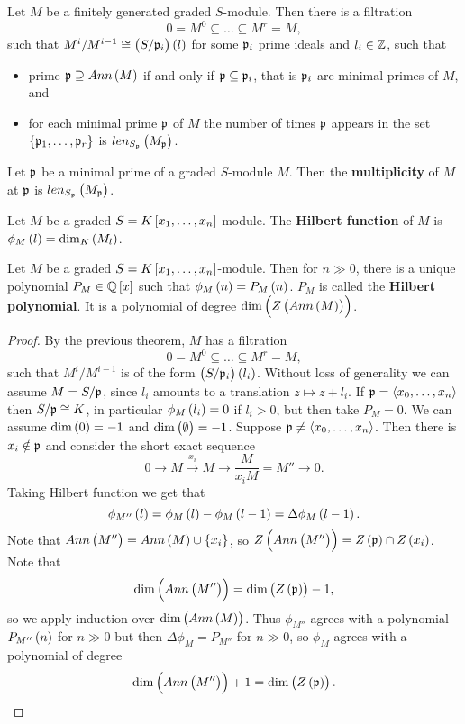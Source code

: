 \begin{theorem}
Let $ M $ be a finitely generated graded $ S $-module. Then there is a filtration
$$ 0 = M^0 \subseteq \dots \subseteq M^r = M, $$
such that $ M^i / M^{i - 1} \cong \br{S / \pp_i}\br{l} $ for some $ \mathfrak{p}_i $ prime ideals and $ l_i \in \mathbb{Z} $, such that
\begin{itemize}
\item prime $ \pp \supseteq Ann\br{M} $ if and only if $ \mathfrak{p} \subseteq \mathfrak{p}_i $, that is $ \mathfrak{p}_i $ are minimal primes of $ M $, and
\item for each minimal prime $ \mathfrak{p} $ of $ M $ the number of times $ \mathfrak{p} $ appears in the set $ \cbr{\pp_1, \dots, \pp_r} $ is $ len_{S_\pp}\br{M_\pp} $.
\end{itemize}
\end{theorem}


\begin{definition}
Let $ \mathfrak{p} $ be a minimal prime of a graded $ S $-module $ M $. Then the \textbf{multiplicity} of $ M $ at $ \mathfrak{p} $ is $ len_{S_\pp}\br{M_\pp} $.
\end{definition}

\begin{definition}
Let $ M $ be a graded $ S = K\sbr{x_1, \dots, x_n} $-module. The \textbf{Hilbert function} of $ M $ is $ \phi_M\br{l} = \dim_K\br{M_l} $.
\end{definition}

\begin{theorem}
Let $ M $ be a graded $ S = K\sbr{x_1, \dots, x_n} $-module. Then for $ n \gg 0 $, there is a unique polynomial $ P_M \in \Q\sbr{x} $ such that $ \phi_M\br{n} = P_M\br{n} $. $ P_M $ is called the \textbf{Hilbert polynomial}. It is a polynomial of degree $ \dim\br{Z\br{Ann\br{M}}} $.
\end{theorem}

\begin{proof}
By the previous theorem, $ M $ has a filtration
$$ 0 = M^0 \subseteq \dots \subseteq M^r = M, $$
such that $ M^i / M^{i - 1} $ is of the form $ \br{S / \pp_i}\br{l_i} $. Without loss of generality we can assume $ M = S / \mathfrak{p} $, since $ l_i $ amounts to a translation $ z \mapsto z + l_i $. If $ \mathfrak{p} = \left\langle x_0, \dots, x_n \right\rangle $ then $ S / \mathfrak{p} \cong K $, in particular $ \phi_M\br{l_i} = 0 $ if $ l_i > 0 $, but then take $ P_M = 0 $. We can assume $ \dim\br{0} = -1 $ and $ \dim\br{\emptyset} = -1 $. Suppose $ \mathfrak{p} \ne \left\langle x_0, \dots, x_n \right\rangle $. Then there is $ x_i \notin \mathfrak{p} $ and consider the short exact sequence
$$ 0 \to M \xrightarrow{x_i} M \to \dfrac{M}{x_iM} = M'' \to 0. $$
Taking Hilbert function we get that
$$ \phi_{M''}\br{l} = \phi_M\br{l} - \phi_M\br{l - 1} = \Delta\phi_M\br{l - 1}. $$
Note that $ Ann\br{M''} = Ann\br{M} \cup \cbr{x_i} $, so $ Z\br{Ann\br{M''}} = Z\br{\pp} \cap Z\br{x_i} $. Note that
$$ \dim\br{Ann\br{M''}} = \dim\br{Z\br{\pp}} - 1, $$
so we apply induction over $ \dim\br{Ann\br{M}} $. Thus $ \phi_{M''} $ agrees with a polynomial $ P_{M''}\br{n} $ for $ n \gg 0 $ but then $ \Delta\phi_M = P_{M''} $ for $ n \gg 0 $, so $ \phi_M $ agrees with a polynomial of degree
$$ \dim\br{Ann\br{M''}} + 1 = \dim\br{Z\br{\pp}}. $$
\end{proof}

